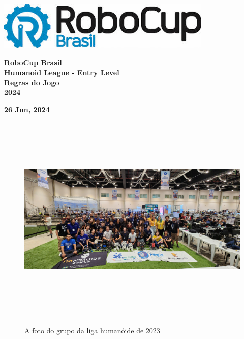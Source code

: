 \documentclass[a4paper]{article}
\title{}
\author{\rulesauthor}
\date{2024-06-26}
\begin{document}
    \sffamily

    \begin{center}
        \includegraphics[height=0.9055in]{img/robocup_logo.jpg}

        {\Huge \bfseries
        RoboCup Brasil
        \\
        Humanoid League -  Entry Level
        \\
        Regras do Jogo
        \\ \vspace{0.5cm}
        2024}

        \bigskip

        {\bfseries 26 Jun, 2024}
    \end{center}

    \begin{figure}[!h]
        \centering
        {\includegraphics[height=4in]{img/cover_2023.jpg}}
        \captionsetup{labelformat=empty}
        \caption{A foto do grupo da liga humanóide de 2023}
    \end{figure}

\end{document}
